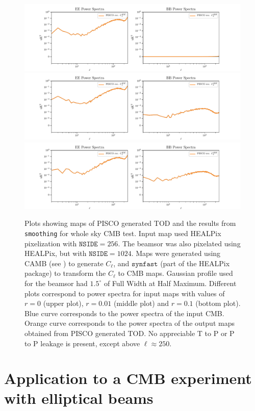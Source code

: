 \documentclass[a4paper,11pt]{article}
\begin{document}
\begin{figure}
	\centering
	\includegraphics[width=1\linewidth]{figures/ps_r0d00.pdf}
	\includegraphics[width=1\linewidth]{figures/ps_r0d01.pdf}
	\includegraphics[width=1\linewidth]{figures/ps_r0d10.pdf}
	\caption{Plots showing maps of PISCO generated TOD and the results from \texttt{smoothing} for whole sky CMB test. Input map used HEALPix pixelization with $\mathrm{\texttt{NSIDE}} = 256$. The beamsor was also pixelated using HEALPix, but with $\mathrm{\texttt{NSIDE}} = 1024$. Maps were generated using CAMB (see \cite{Lewis:2002ah}) to generate $C_\ell$, and $\texttt{synfast}$ (part of the HEALPix package) to transform the $C_\ell$ to CMB maps. Gaussian profile used for the beamsor had $1.5^\circ$ of Full Width at Half Maximum. Different plots correspond to power spectra for input maps with values of $r=0$ (upper plot), $r=0.01$ (middle plot) and $r=0.1$ (bottom plot). Blue curve corresponds to the power spectra of the input CMB. Orange curve corresponds to the power spectra of the output maps obtained from PISCO generated TOD. No appreciable T to P or P to P leakage is present, except above $\ell \approx 250$.}
	\label{fig::pisco4wholesky}
\end{figure}

%
\section{Application to a CMB experiment with elliptical beams}
\label{sec::class_pisco_sim}
\end{document}
